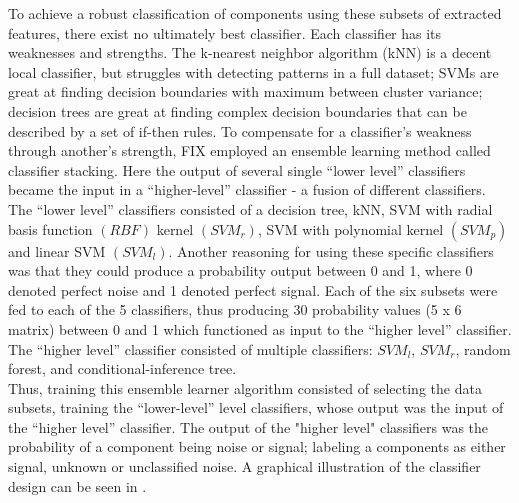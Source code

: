 To achieve a robust classification of components using these subsets of extracted features, there exist no ultimately best classifier. Each classifier has its weaknesses and strengths. The k-nearest neighbor algorithm (kNN) is a decent local classifier, but struggles with detecting patterns in a full dataset; SVMs are great at finding decision boundaries with maximum between cluster variance; decision trees are great at finding complex decision boundaries that can be described by a set of if-then rules. To compensate for a classifier’s weakness through another’s strength, FIX employed an ensemble learning method called classifier stacking. Here the output of several single “lower level” classifiers became the input in a “higher-level” classifier - a fusion of different classifiers. The “lower level” classifiers consisted of a decision tree, kNN, SVM with radial basis function $(RBF)$ kernel $(SVM_r)$, SVM with polynomial kernel $(SVM_p)$ and linear SVM $(SVM_l)$. Another reasoning for using these specific classifiers was that they could produce a probability output between 0 and 1, where 0 denoted perfect noise and 1 denoted perfect signal. Each of the six subsets were fed to each of the 5 classifiers, thus producing 30 probability values (5 x 6 matrix) between 0 and 1 which functioned as input to the “higher level” classifier. The “higher level” classifier consisted of multiple classifiers: $SVM_l$, $SVM_r$, random forest, and conditional-inference tree. \\
Thus, training this ensemble learner algorithm consisted of selecting the data subsets, training the “lower-level” level classifiers, whose output was the input of the “higher level” classifier. The output of the "higher level" classifiers was the probability of a component being noise or signal; labeling a components as either signal, unknown or unclassified noise. A graphical illustration of the classifier design can be seen in . %

